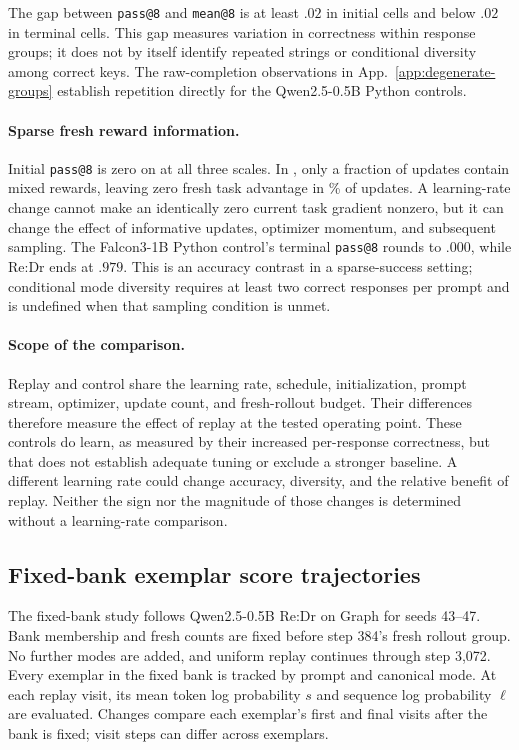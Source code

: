 \documentclass{article}
\newcommand{\1}{\mathbf 1}
\theoremstyle{remark}
\theoremstyle{definition}
\theoremstyle{plain}
\begin{document}
The gap between \texttt{pass@8} and \texttt{mean@8} is at least $.02$ in
\MDctlOpened{} initial cells and below $.02$ in \MDctlClosed{} terminal
cells. This gap measures variation in correctness within response groups;
it does not by itself identify repeated strings or conditional diversity
among correct keys. The raw-completion observations in
App.~\ref{app:degenerate-groups} establish repetition directly for the
Qwen2.5-0.5B Python controls.

\paragraph{Sparse fresh reward information.}
Initial \texttt{pass@8} is zero on \MDctlZeroBaseDomain{} at all three
scales. In \MDctlLeanestCell{}, only a fraction \MDctlLeanestMixed{} of
updates contain mixed rewards, leaving zero fresh task advantage in
\MDctlLeanestZero{}\% of updates. A learning-rate change cannot make an
identically zero current task gradient nonzero, but it can change the effect
of informative updates, optimizer momentum, and subsequent sampling.
The Falcon3-1B Python control's terminal \texttt{pass@8} rounds to $.000$, while Re:Dr
ends at $.979$. This is an accuracy contrast in a sparse-success setting;
conditional mode diversity requires at least two correct responses per
prompt and is undefined when that sampling condition is unmet.

\paragraph{Scope of the comparison.}
Replay and control share the learning rate, schedule, initialization,
prompt stream, optimizer, update count, and fresh-rollout budget.
Their differences therefore measure the effect of replay at the tested
operating point. These controls do learn, as measured by their increased
per-response correctness, but that does not establish adequate tuning or
exclude a stronger baseline. A different learning rate could change accuracy,
diversity, and the relative benefit of replay. Neither the sign nor the
magnitude of those changes is determined without a learning-rate comparison.

\subsection{Fixed-bank exemplar score trajectories}
\label{app:fixed-bank-survival}

The fixed-bank study follows Qwen2.5-0.5B Re:Dr on Graph for seeds
43--47. Bank membership and fresh counts are fixed before step 384's
fresh rollout group. No further modes are added, and uniform replay
continues through step 3,072. Every exemplar in the fixed bank is tracked
by prompt and canonical mode. At each replay visit, its mean token log
probability $s$ and sequence log probability $\ell$ are evaluated.
Changes compare each exemplar's first and final visits after the bank is
fixed; visit steps can differ across exemplars.
\end{document}
